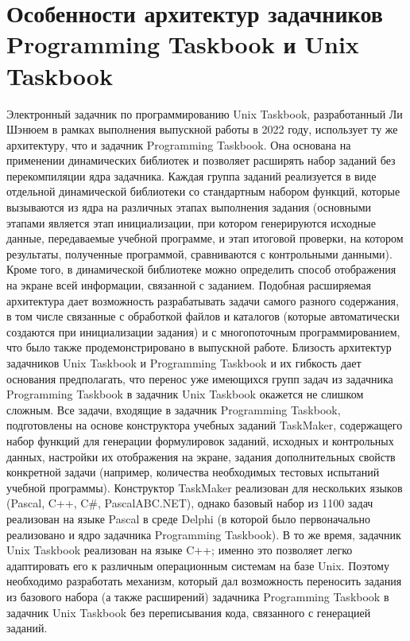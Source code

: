 \section{Особенности архитектур задачников Programming Taskbook и Unix Taskbook}

Электронный задачник по программированию Unix Taskbook, разработанный Ли Шэнюем в рамках выполнения выпускной работы в 2022 году, использует ту же архитектуру, что и задачник Programming Taskbook. Она основана на применении динамических библиотек и позволяет расширять набор заданий без перекомпиляции ядра задачника. Каждая группа заданий реализуется в виде отдельной динамической библиотеки со стандартным набором функций, которые вызываются из ядра на различных этапах выполнения задания (основными этапами является этап инициализации, при котором генерируются исходные данные, передаваемые учебной программе, и этап итоговой проверки, на котором результаты, полученные программой, сравниваются с контрольными данными). Кроме того, в динамической библиотеке можно определить способ отображения на экране всей информации, связанной с заданием. 
Подобная расширяемая архитектура дает возможность разрабатывать задачи самого разного содержания, в том числе связанные с обработкой файлов и каталогов (которые автоматически создаются при инициализации задания) и с многопоточным программированием, что было также продемонстрировано в выпускной работе.
Близость архитектур задачников  Unix Taskbook и Programming Taskbook и их гибкость дает основания предполагать, что перенос уже имеющихся групп задач из задачника Programming Taskbook в задачник Unix Taskbook окажется не слишком сложным.
Все задачи, входящие в задачник Programming Taskbook, подготовлены на основе конструктора учебных заданий TaskMaker, содержащего набор функций для генерации формулировок заданий, исходных и контрольных данных, настройки их отображения на экране, задания дополнительных свойств конкретной задачи (например, количества необходимых тестовых испытаний учебной программы). Конструктор TaskMaker реализован для нескольких языков (Pascal, C++, C\#, PascalABC.NET), однако базовый набор из 1100 задач реализован на языке Pascal в среде Delphi (в которой было первоначально реализовано и ядро задачника Programming Taskbook).
В то же время, задачник Unix Taskbook реализован на языке C++; именно это позволяет легко адаптировать его к различным операционным системам на базе Unix. Поэтому необходимо разработать механизм, который дал возможность переносить задания из базового набора (а также расширений) задачника Programming Taskbook в задачник Unix Taskbook без переписывания кода, связанного с генерацией заданий.



